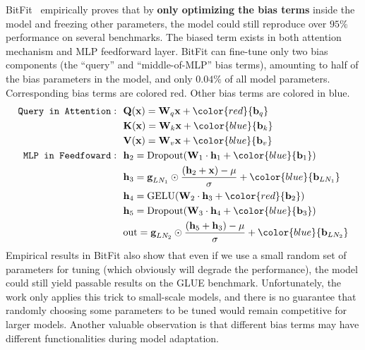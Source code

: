 BitFit~\citep{DBLP:conf/acl/ZakenGR22} empirically proves that by \textbf{only optimizing the bias terms} inside the model and freezing other parameters, the model could still reproduce over $95\%$ performance on several benchmarks. 
The biased term exists in both attention mechanism and MLP feedforward layer. BitFit can fine-tune only two bias components (the “query” and “middle-of-MLP” bias terms), amounting to half of the bias parameters in the model, and only $0.04\%$ of all model parameters. Corresponding bias terms are colored red. Other bias terms are colored in blue.
\begin{align}
    \texttt{Query in Attention}:& \ \ \textbf{Q}(\textbf{x}) = \textbf{W}_{q}\textbf{x} + {\color{red}{\textbf{b}_{q}}} \\
    & \ \ \textbf{K}(\textbf{x}) = \textbf{W}_{k}\textbf{x} + {\color{blue}{\textbf{b}_{k}}} \\
    & \ \ \textbf{V}(\textbf{x}) = \textbf{W}_{v}\textbf{x} + {\color{blue}{\textbf{b}_{v}}} \\
    \texttt{MLP in Feedfoward}:& \ \ \textbf{h}_{2} = \text{Dropout}(\textbf{W}_{1} \cdot \textbf{h}_{1} + {\color{blue}{\textbf{b}_{1}}}) \\
    & \ \ \textbf{h}_{3} = \textbf{g}_{LN_{1}} \odot \frac{(\textbf{h}_{2}+\textbf{x})-\mu}{\sigma} + {\color{blue}{\textbf{b}_{LN_{1}}}} \\
    & \ \ \textbf{h}_{4} = \text{GELU}(\textbf{W}_{2} \cdot \textbf{h}_{3} + {\color{red}{\textbf{b}_{2}}}) \\
    & \ \ \textbf{h}_{5} = \text{Dropout}(\textbf{W}_{3} \cdot \textbf{h}_{4} + {\color{blue}{\textbf{b}_{3}}}) \\
    & \ \ \text{out} = \textbf{g}_{LN_{2}} \odot \frac{(\textbf{h}_{5}+\textbf{h}_{3})-\mu}{\sigma} + {\color{blue}{\textbf{b}_{LN_{2}}}} 
\end{align}
Empirical results in BitFit also show that even if we use a small random set of parameters for tuning (which obviously will degrade the performance), the model could still yield passable results on the GLUE benchmark. 
Unfortunately, the work only applies this trick to small-scale models, and there is no guarantee that randomly choosing some parameters to be tuned would remain competitive for larger models. Another valuable observation is that different bias terms may have different functionalities during model adaptation.

